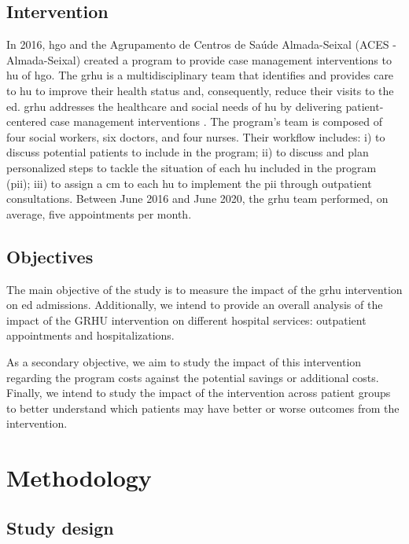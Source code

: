 \documentclass{bmcart}
\begin{document}
\subsection*{Intervention}

In 2016, \gls{hgo} and the Agrupamento de Centros de Saúde Almada-Seixal (ACES - Almada-Seixal) created a program to provide case management interventions to \gls{hu} of \gls{hgo}.
The \gls{grhu} is a multidisciplinary team that identifies and provides care to \gls{hu} to improve their health status and, consequently, reduce their visits to the \gls{ed}.
\gls{grhu} addresses the healthcare and social needs of \gls{hu} by delivering patient-centered case management interventions \cite{kanter_clinical_1989}.
The program's team is composed of four social workers, six doctors, and four nurses.
Their workflow includes: i) to discuss potential patients to include in the program; ii) to discuss and plan personalized steps to tackle the situation of each \gls{hu} included in the program (\gls{pii}); iii) to assign a \gls{cm} to each \gls{hu} to implement the \gls{pii} through outpatient consultations.
Between June 2016 and June 2020, the \gls{grhu} team performed, on average, five appointments per month.

\subsection*{Objectives}
The main objective of the study is to measure the impact of the \gls{grhu} intervention on \gls{ed} admissions. Additionally, we intend to provide an overall analysis of the impact of the GRHU intervention on different hospital services: outpatient appointments and hospitalizations. 
\par As a secondary objective, we aim to study the impact of this intervention regarding the program costs against the potential savings or additional costs. Finally, we intend to study the impact of the intervention across patient groups to better understand which patients may have better or worse outcomes from the intervention.


\section*{Methodology}

\subsection*{Study design}
\end{document}
